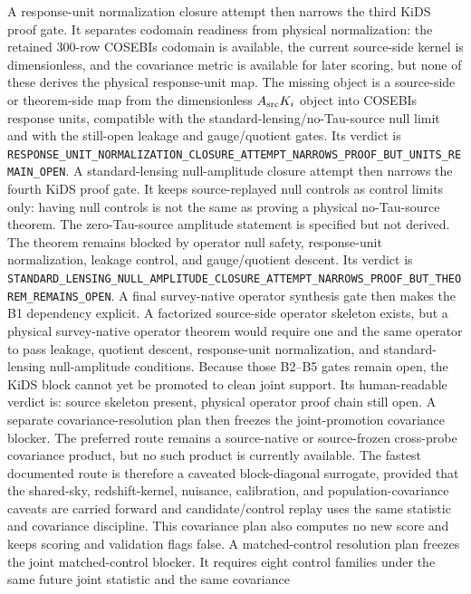 A response-unit normalization closure attempt then narrows the third KiDS proof
gate.  It separates codomain readiness from physical normalization: the
retained 300-row COSEBIs codomain is available, the current source-side kernel
is dimensionless, and the covariance metric is available for later scoring, but
none of these derives the physical response-unit map.  The missing object is a
source-side or theorem-side map from the dimensionless \(A_{\rm src}K_i\)
object into COSEBIs response units, compatible with the
standard-lensing/no-Tau-source null limit and with the still-open leakage and
gauge/quotient gates.  Its verdict is
\texttt{RESPONSE\_UNIT\_NORMALIZATION\_CLOSURE\_ATTEMPT\_NARROWS\_PROOF\_BUT\_UNITS\_REMAIN\_OPEN}.
A standard-lensing null-amplitude closure attempt then narrows the fourth KiDS
proof gate.  It keeps source-replayed null controls as control limits only:
having null controls is not the same as proving a physical no-Tau-source
theorem.  The zero-Tau-source amplitude statement is specified but not derived.
The theorem remains blocked by operator null safety, response-unit
normalization, leakage control, and gauge/quotient descent.  Its verdict is
\texttt{STANDARD\_LENSING\_NULL\_AMPLITUDE\_CLOSURE\_ATTEMPT\_NARROWS\_PROOF\_BUT\_THEOREM\_REMAINS\_OPEN}.
A final survey-native operator synthesis gate then makes the B1 dependency
explicit.  A factorized source-side operator skeleton exists, but a physical
survey-native operator theorem would require one and the same operator to pass
leakage, quotient descent, response-unit normalization, and standard-lensing
null-amplitude conditions.  Because those B2--B5 gates remain open, the KiDS
block cannot yet be promoted to clean joint support.  Its human-readable
verdict is: source skeleton present, physical operator proof chain still open.
A separate covariance-resolution plan then freezes the joint-promotion
covariance blocker.  The
preferred route remains a source-native or source-frozen cross-probe covariance
product, but no such product is currently available.  The fastest documented
route is therefore a caveated block-diagonal surrogate, provided that the
shared-sky, redshift-kernel, nuisance, calibration, and population-covariance
caveats are carried forward and candidate/control replay uses the same
statistic and covariance discipline.  This covariance plan also computes no new
score and keeps scoring and validation flags false.
A matched-control resolution plan freezes the joint matched-control blocker.  It requires eight
control families under the same future joint statistic and the same covariance
